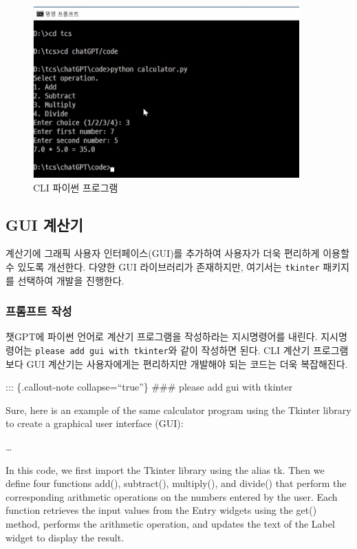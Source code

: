 \documentclass[
  letterpaper,
]{book}
\begin{document}
\begin{figure}

{\centering \includegraphics[width=4.03125in,height=\textheight]{images/calculator_cli.jpg}

}

\caption{CLI 파이썬 프로그램}

\end{figure}

\hypertarget{gui-uxacc4uxc0b0uxae30}{%
\subsection{GUI 계산기}\label{gui-uxacc4uxc0b0uxae30}}

계산기에 그래픽 사용자 인터페이스(GUI)를 추가하여 사용자가 더욱 편리하게
이용할 수 있도록 개선한다. 다양한 GUI 라이브러리가 존재하지만, 여기서는
\texttt{tkinter} 패키지를 선택하여 개발을 진행한다.

\hypertarget{uxd504uxb86cuxd504uxd2b8-uxc791uxc131-1}{%
\subsubsection{프롬프트
작성}\label{uxd504uxb86cuxd504uxd2b8-uxc791uxc131-1}}

챗GPT에 파이썬 언어로 계산기 프로그램을 작성하라는 지시명령어를 내린다.
지시명령어는 \texttt{please\ add\ gui\ with\ tkinter}와 같이 작성하면
된다. CLI 계산기 프로그램보다 GUI 계산기는 사용자에게는 편리하지만
개발해야 되는 코드는 더욱 복잡해진다.

::: \{.callout-note collapse=``true''\} \#\#\# please add gui with
tkinter

Sure, here is an example of the same calculator program using the
Tkinter library to create a graphical user interface (GUI):

\ldots{}

In this code, we first import the Tkinter library using the alias tk.
Then we define four functions add(), subtract(), multiply(), and
divide() that perform the corresponding arithmetic operations on the
numbers entered by the user. Each function retrieves the input values
from the Entry widgets using the get() method, performs the arithmetic
operation, and updates the text of the Label widget to display the
result.
\end{document}

